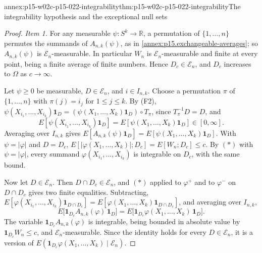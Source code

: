 \begin{annexitem}{annex:p15-w02c-p15-022-integrability}{thm:p15-w02c-p15-022-integrability}{The integrability hypothesis and the exceptional null sets}
\begin{proof}
\emph{Item 1.} For any measurable \(\psi:S^k\to\mathbb R\), a permutation
of \(\{1,\ldots,n\}\) permutes the summands of \(A_{n,k}(\psi)\), as in
\cref{annex:p15.exchangeable-averages}; so \(A_{n,k}(\psi)\) is
\(\mathcal E_n\)-measurable. In particular \(W_n\) is
\(\mathcal E_n\)-measurable and finite at every point, being a finite
average of finite numbers. Hence \(D_c\in\mathcal E_n\), and \(D_c\)
increases to \(\Omega\) as \(c\to\infty\).

Let \(\psi\geq0\) be measurable, \(D\in\mathcal E_n\), and
\(i\in I_{n,k}\). Choose a permutation \(\pi\) of \(\{1,\ldots,n\}\) with
\(\pi(j)=i_j\) for \(1\leq j\leq k\). By (F2),
\(\psi(X_{i_1},\ldots,X_{i_k})\mathbf1_D
 =(\psi(X_1,\ldots,X_k)\mathbf1_D)\circ T_\pi\), since
\(T_\pi^{-1}D=D\), and
\[
 E[\psi(X_{i_1},\ldots,X_{i_k})\mathbf1_D]
   =E[\psi(X_1,\ldots,X_k)\mathbf1_D]\in[0,\infty].
\tag{\(*\)}
\]
Averaging over \(I_{n,k}\) gives
\(E[A_{n,k}(\psi)\mathbf1_D]=E[\psi(X_1,\ldots,X_k)\mathbf1_D]\). With
\(\psi=|\varphi|\) and \(D=D_c\),
\(E[|\varphi(X_1,\ldots,X_k)|;D_c]=E[W_n;D_c]\leq c\). By \((*)\) with
\(\psi=|\varphi|\), every summand \(\varphi(X_{i_1},\ldots,X_{i_k})\)
is integrable on \(D_c\), with the same bound.

Now let \(D\in\mathcal E_n\). Then \(D\cap D_c\in\mathcal E_n\), and
\((*)\) applied to \(\varphi^+\) and to \(\varphi^-\) on \(D\cap D_c\)
gives two finite equalities. Subtracting,
\(E[\varphi(X_{i_1},\ldots,X_{i_k})\mathbf1_{D\cap D_c}]
 =E[\varphi(X_1,\ldots,X_k)\mathbf1_{D\cap D_c}]\), and averaging over
\(I_{n,k}\),
\[
 E\bigl[\mathbf1_{D_c}A_{n,k}(\varphi)\,\mathbf1_D\bigr]
   =E\bigl[\mathbf1_{D_c}\varphi(X_1,\ldots,X_k)\,\mathbf1_D\bigr].
\]
The variable \(\mathbf1_{D_c}A_{n,k}(\varphi)\) is integrable, being
bounded in absolute value by \(\mathbf1_{D_c}W_n\leq c\), and
\(\mathcal E_n\)-measurable. Since the identity holds for every
\(D\in\mathcal E_n\), it is a version of
\(E(\mathbf1_{D_c}\varphi(X_1,\ldots,X_k)\mid\mathcal E_n)\).


\end{proof}
\end{annexitem}
